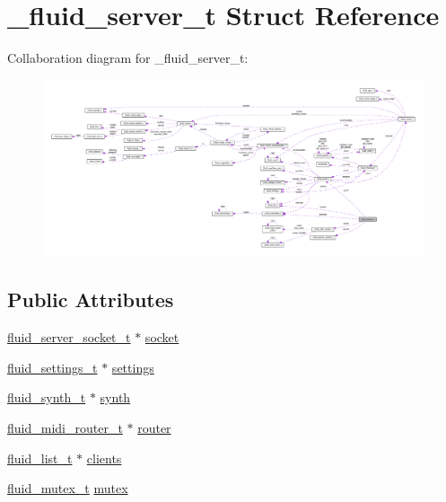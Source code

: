 \hypertarget{struct__fluid__server__t}{}\section{\+\_\+fluid\+\_\+server\+\_\+t Struct Reference}
\label{struct__fluid__server__t}


Collaboration diagram for \+\_\+fluid\+\_\+server\+\_\+t\+:
\nopagebreak
\begin{figure}[H]
\begin{center}
\leavevmode
\includegraphics[width=350pt]{struct__fluid__server__t__coll__graph}
\end{center}
\end{figure}
\subsection*{Public Attributes}
\begin{DoxyCompactItemize}
\item 
\hyperlink{fluidsynth__priv_8h_a1b3924046f25f0f93876aeb093b613b9}{fluid\+\_\+server\+\_\+socket\+\_\+t} $\ast$ \hyperlink{struct__fluid__server__t_a738603070c2e5b4fc0e99e0a1471715a}{socket}
\item 
\hyperlink{types_8h_aa363402d3c77333b0f070ba531d034ba}{fluid\+\_\+settings\+\_\+t} $\ast$ \hyperlink{struct__fluid__server__t_a9d53707a5c9e1ff69da7169f7b818277}{settings}
\item 
\hyperlink{types_8h_ae265f10ae174a13afe010de50d87e1a4}{fluid\+\_\+synth\+\_\+t} $\ast$ \hyperlink{struct__fluid__server__t_ac67b75b1c51efea21e5ce8450e9872f6}{synth}
\item 
\hyperlink{types_8h_aa57b4746220e24506a169f109875e4ad}{fluid\+\_\+midi\+\_\+router\+\_\+t} $\ast$ \hyperlink{struct__fluid__server__t_a65636a3cc37392467d7fd6e4297b582c}{router}
\item 
\hyperlink{fluid__list_8h_a3ef7535d4290862c0af118569223bd89}{fluid\+\_\+list\+\_\+t} $\ast$ \hyperlink{struct__fluid__server__t_a25218bbaabb90057d1ed60096f366aac}{clients}
\item 
\hyperlink{fluid__sys_8h_a7252a44982e8ed2704689f563c8a12e3}{fluid\+\_\+mutex\+\_\+t} \hyperlink{struct__fluid__server__t_ab961b06dab40b5161a81ac78bb3957f2}{mutex}
\end{DoxyCompactItemize}


